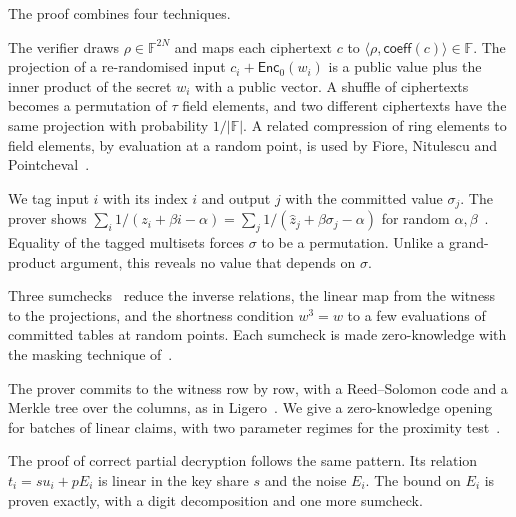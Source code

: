 \documentclass[sigconf,anonymous]{acmart}
\newcommand{\F}{\mathbb{F}}
\newcommand{\EncZ}{\mathsf{Enc}_0}
\newcommand{\coeff}{\mathsf{coeff}}
\newcommand{\ip}[2]{\langle #1, #2\rangle}
\newcommand{\zh}{\hat{z}}
\begin{document}
The proof combines four techniques.
\begin{description}[leftmargin=1em,itemsep=2pt,topsep=3pt]
\item[Field projection.] The verifier draws $\rho\in\F^{2N}$ and maps each ciphertext $c$ to
  $\ip{\rho}{\coeff(c)}\in\F$. The projection of a re-randomised input $c_i+\EncZ(w_i)$ is a public
  value plus the inner product of the secret $w_i$ with a public vector. A shuffle of ciphertexts
  becomes a permutation of $\tau$ field elements, and two different ciphertexts have the same
  projection with probability $1/|\F|$. A related compression of ring elements to field elements, by
  evaluation at a random point, is used by Fiore, Nitulescu and Pointcheval~\cite{FNP20}.
\item[Tagged logarithmic derivative.] We tag input $i$ with its index $i$ and output $j$ with the
  committed value $\sigma_j$. The prover shows
  $\sum_i 1/(z_i+\beta i-\alpha)=\sum_j 1/(\zh_j+\beta\sigma_j-\alpha)$ for random
  $\alpha,\beta$~\cite{Hab22}. Equality of the tagged multisets forces $\sigma$ to be a
  permutation. Unlike a grand-product argument, this reveals no value that depends on $\sigma$.
\item[Masked sumchecks.] Three sumchecks~\cite{LFKN92} reduce the inverse relations, the linear map
  from the witness to the projections, and the shortness condition $w^3=w$ to a few evaluations of
  committed tables at random points. Each sumcheck is made zero-knowledge with the masking technique
  of~\cite{CFS17,Libra}.
\item[Hash-based commitment.] The prover commits to the witness row by row, with a Reed--Solomon code
  and a Merkle tree over the columns, as in Ligero~\cite{AHIV17}. We give a zero-knowledge opening
  for batches of linear claims, with two parameter regimes for the proximity
  test~\cite{DP23,BCIKS20}.
\end{description}
The proof of correct partial decryption follows the same pattern. Its relation $t_i=su_i+pE_i$ is
linear in the key share $s$ and the noise $E_i$. The bound on $E_i$ is proven exactly, with a digit
decomposition and one more sumcheck.
\end{document}
